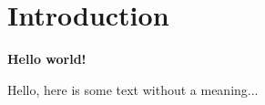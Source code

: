 \documentclass[main.tex]{subfiles}
\begin{document}
\section{Introduction}

\textbf{Hello world!}

Hello, here is some text without a meaning...
\end{document}
